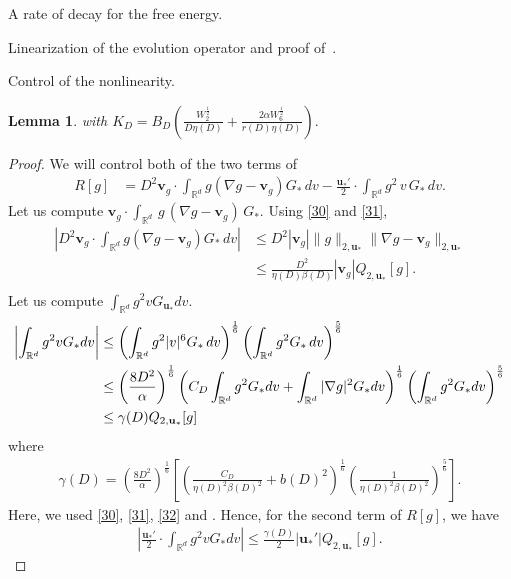 \documentclass[reqno]{amsart} %
\newtheorem{lemma}{Lemma}[section]
\begin{document}
\begin{section}{A rate of decay for the free energy.}
\begin{section}{Linearization of the evolution operator and proof of~\texorpdfstring{}{thm3}.}
\begin{subsection}{Control of the nonlinearity.}
\begin{lemma}
with $K_D= B_D\left(\frac{W_2^{\frac{1}{2}}}{D \eta(D) }+ \frac{2 \alpha W_6^{\frac{1}{2}}}{r(D)\eta(D)}\right).$
\end{lemma}
\begin{proof}
        We will control both of the two terms of 
        \begin{align*}
              R[g]&=D^2 \mathbf{v}_g  \cdot \int_{\mathbb{R}^d}g(\nabla g- \mathbf{v}_g)G_{*}\,dv -\frac{\mathbf{u}_*'}{2}\cdot \int_{\mathbb{R}^d}g^2\,v\,G_{*}\,dv.
        \end{align*}
Let us compute  $ \mathbf{v}_g \cdot \int_{\mathbb{R}^d}\,g\,(\nabla g- \mathbf{v}_g)\,G_{{*}}$. 
Using \eqref{30} and \eqref{31},
\begin{align*}
        \left |D^2 \mathbf{v}_g \cdot \int_{\mathbb{R}^d}g(\nabla g- \mathbf{v}_g)G_{{*}}\,dv \right|&\leq D^2|\mathbf{v}_g| \lVert g \rVert_{2,\mathbf{u}_*} \lVert \nabla g -\mathbf{v}_g  \rVert_{2,\mathbf{u}_*}\\
        &  \leq \frac{D^2}{\eta(D) \beta(D)} |\mathbf{v}_g|Q_{2,\mathbf{u}_{*}}[g].\\
    \end{align*}
Let us compute $\int_{\mathbb{R}^d}g^2vG_{\mathbf{u}_*}dv.$
\begin{align}
\label{eenormeq}
   \left| \int_{\mathbb{R}^d}g^2vG_{{*}}dv \right | &\leq  \left( \int_{\mathbb{R}^d}g^2 |v|^6 G_{{*}}\,dv\right)^\frac{1}{6} \left( \int_{\mathbb{R}^d}g^2 G_{{*}}\,dv\right)^\frac{5}{6} \notag \\
   &\leq \left( \frac{8D^2}{\alpha}\right)^{\frac{1}{6}} \left( C_D\int_{\mathbb{R}^d}g^2  G_{{*}}dv+ \int_{\mathbb{R}^d}|\nabla g|^2  G_{{*}}dv\right)^\frac{1}{6} \left( \int_{\mathbb{R}^d}g^2 G_{{*}} dv\right)^\frac{5}{6}  \notag \\
   & \leq \gamma(D)Q_{2,\mathbf{u}_*}[g]
\end{align}
where 
\begin{align*}
    \gamma(D)=\left( \frac{8D^2}{\alpha}\right)^{\frac{1}{6}} \left[\left(\frac{C_D}{\eta(D)^2 \beta(D)^2}+b(D)^2\right)^{\frac{1}{6}} \left(\frac{1}{\eta(D)^2 \beta(D)^2} \right)^{\frac{5}{6}}\right].
\end{align*}
Here, we used \eqref{30}, \eqref{31}, \eqref{32} and  .
Hence, for the second term of $R[g]$, we have
\begin{align*}
    \left|\frac{\mathbf{u}_*'}{2}\cdot \int_{\mathbb{R}^d}g^2vG_{*}dv\right| \leq \frac{\gamma(D) }{2} |\mathbf{u}_*'|Q_{2,\mathbf{u}_*}[g].
\end{align*}

\end{proof}
\end{subsection}
\end{section}
\end{section}
\end{document}
